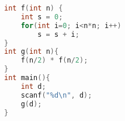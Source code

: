 \begin{lstlisting}[language=C++]
int f(int n) {
    int s = 0;
    for(int i=0; i<n*n; i++)
        s = s + i;
}
int g(int n){
    f(n/2) * f(n/2);
}
int main(){
    int d;
    scanf("%d\n", d);
    g(d);
}
\end{lstlisting}
